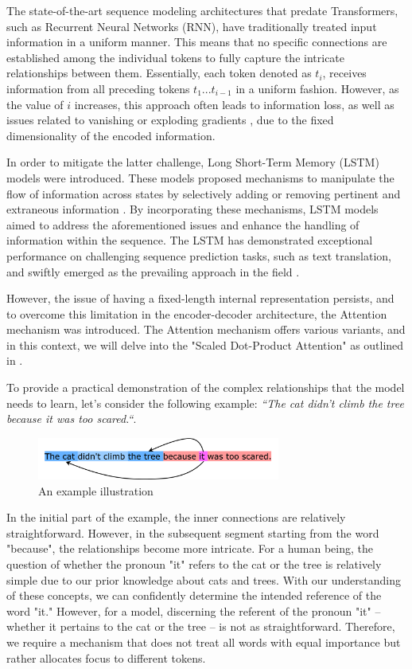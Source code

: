 The state-of-the-art sequence modeling architectures that predate Transformers, such as Recurrent Neural Networks (RNN), have traditionally treated input information in a uniform manner. This means that no specific connections are established among the individual tokens to fully capture the intricate relationships between them. Essentially, each token denoted as $t_i$, receives information from all preceding tokens $t_1...t_{i-1}$ in a uniform fashion. However, as the value of $i$ increases, this approach often leads to information loss, as well as issues related to vanishing or exploding gradients \citep{hochreiter1997long}, due to the fixed dimensionality of the encoded information.

In order to mitigate the latter challenge, Long Short-Term Memory (LSTM) models were introduced. These models proposed mechanisms to manipulate the flow of information across states by selectively adding or removing pertinent and extraneous information \citep{hochreiter1997long}. By incorporating these mechanisms, LSTM models aimed to address the aforementioned issues and enhance the handling of information within the sequence.
The LSTM has demonstrated exceptional performance on challenging sequence prediction tasks, such as text translation, and swiftly emerged as the prevailing approach in the field \citep{cho2014learning, sutskever2014sequence}.

However, the issue of having a fixed-length internal representation persists, and to overcome this limitation in the encoder-decoder architecture, the Attention mechanism was introduced. The Attention mechanism offers various variants, and in this context, we will delve into the "Scaled Dot-Product Attention" as outlined in \cite{vaswani2017attention}.

To provide a practical demonstration of the complex relationships that the model needs to learn, let's consider the following example: \emph{``The cat didn't climb the tree because it was too scared.``}.
\begin{figure}[h]
    \centering
    \includegraphics[width=8cm]{pages/imgs/example.png}
    \caption{An example illustration}
    \label{fig:example}
\end{figure}
In the initial part of the example, the inner connections are relatively straightforward. However, in the subsequent segment starting from the word "because", the relationships become more intricate.
For a human being, the question of whether the pronoun "it" refers to the cat or the tree is relatively simple due to our prior knowledge about cats and trees. With our understanding of these concepts, we can confidently determine the intended reference of the word "it." 
However, for a model, discerning the referent of the pronoun "it" -- whether it pertains to the cat or the tree -- is not as straightforward. Therefore, we require a mechanism that does not treat all words with equal importance but rather allocates focus to different tokens.

